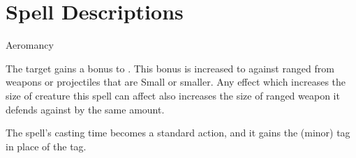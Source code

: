 
\section{Spell Descriptions}

\begin{spellsection}{Aeromancy}

\begin{spellheader}
\end{spellheader}

\begin{spellcontent}

\begin{spelltargetinginfo}



\end{spelltargetinginfo}


\begin{spelleffects}



\spelleffect
The target gains a  bonus to .
This bonus is increased to  against ranged  from weapons or projectiles that are Small or smaller.
Any effect which increases the size of creature this spell can affect also increases the size of ranged weapon it defends against by the same amount.








\end{spelleffects}

\end{spellcontent}
\begin{spellfooter}


\end{spellfooter}
\begin{spellsubcontent}


\begin{spellcantrip}
The spell's casting time becomes a standard action, and it gains the  (minor) tag in place of the  tag.
\end{spellcantrip}


\end{spellsubcontent}
\end{spellsection}


